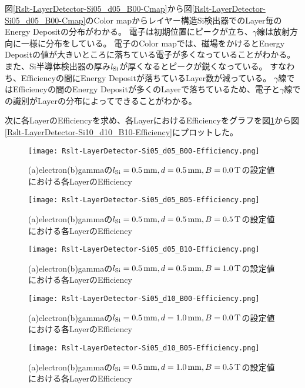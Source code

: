 \documentclass[a4paper,10pt]{jreport}
\begin{document}
図\ref{Rslt-LayerDetector-Si05_d05_B00-Cmap}から図\ref{Rslt-LayerDetector-Si05_d05_B00-Cmap}のColor mapからレイヤー構造Si検出器でのLayer毎のEnergy Depositの分布がわかる。
電子は初期位置にピークが立ち、$\gamma$線は放射方向に一様に分布をしている。
電子のColor mapでは、磁場をかけるとEnergy Depositの値が大きいところに落ちている電子が多くなっていることがわかる。
また、Si半導体検出器の厚み$l_{\rm{Si}}$が厚くなるとピークが鋭くなっている。
すなわち、Efficiencyの間にEnergy Depositが落ちているLayer数が減っている。
$\gamma$線ではEfficiencyの間のEnergy Depositが多くのLayerで落ちているため、電子と$\gamma$線での識別がLayerの分布によってできることがわかる。

次に各LayerのEfficiencyを求め、各LayerにおけるEfficiencyをグラフを図\ref{Rslt-LayerDetector-Si05_d05_B00-Efficiency}から図\ref{Rslt-LayerDetector-Si10_d10_B10-Efficiency}にプロットした。

\begin{figure}[H]
	\center
	\texttt{[image: Rslt-LayerDetector-Si05\_d05\_B00-Efficiency.png]}
	\caption{(a)electron(b)gammaの$l_{\rm{Si}}=\SI{0.5}{mm}, d=\SI{0.5}{mm}, B=\SI{0.0}{T}$の設定値における各LayerのEfficiency}
	\label{Rslt-LayerDetector-Si05_d05_B00-Efficiency}
\end{figure}

\begin{figure}[H]
	\center
	\texttt{[image: Rslt-LayerDetector-Si05\_d05\_B05-Efficiency.png]}
	\caption{(a)electron(b)gammaの$l_{\rm{Si}}=\SI{0.5}{mm}, d=\SI{0.5}{mm}, B=\SI{0.5}{T}$の設定値における各LayerのEfficiency}
	\label{Rslt-LayerDetector-Si05_d05_B05-Efficiency}
\end{figure}

\begin{figure}[H]
	\center
	\texttt{[image: Rslt-LayerDetector-Si05\_d05\_B10-Efficiency.png]}
	\caption{(a)electron(b)gammaの$l_{\rm{Si}}=\SI{0.5}{mm}, d=\SI{0.5}{mm}, B=\SI{1.0}{T}$の設定値における各LayerのEfficiency}
	\label{Rslt-LayerDetector-Si05_d05_B10-Efficiency}
\end{figure}

\begin{figure}[H]
	\center
	\texttt{[image: Rslt-LayerDetector-Si05\_d10\_B00-Efficiency.png]}
	\caption{(a)electron(b)gammaの$l_{\rm{Si}}=\SI{0.5}{mm}, d=\SI{1.0}{mm}, B=\SI{0.0}{T}$の設定値における各LayerのEfficiency}
	\label{Rslt-LayerDetector-Si05_d10_B00-Efficiency}
\end{figure}

\begin{figure}[H]
	\center
	\texttt{[image: Rslt-LayerDetector-Si05\_d10\_B05-Efficiency.png]}
	\caption{(a)electron(b)gammaの$l_{\rm{Si}}=\SI{0.5}{mm}, d=\SI{1.0}{mm}, B=\SI{0.5}{T}$の設定値における各LayerのEfficiency}
	\label{Rslt-LayerDetector-Si05_d10_B05-Efficiency}
\end{figure}
\end{document}
